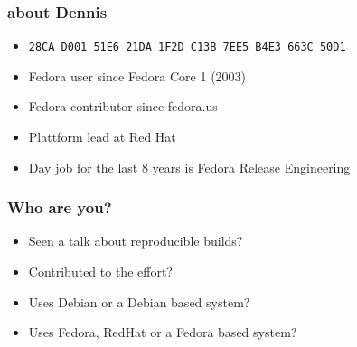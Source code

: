 \documentclass[14pt]{beamer}
\newif\ifplacelogo
\begin{document}
\begin{frame}
 \frametitle{about Dennis}

 \begin{itemize}
  \item \small{\texttt{28CA D001 51E6 21DA 1F2D  C13B 7EE5 B4E3 663C 50D1}}
  \item Fedora user since Fedora Core 1 (2003)
  \item Fedora contributor since fedora.us
  \item Plattform lead at Red Hat
  \item Day job for the last 8 years is Fedora Release Engineering
  \end{itemize}
\end{frame}



\begin{frame}
 \frametitle{Who are you?}
 \begin{itemize}
  \item<2-5> Seen a talk about reproducible builds?
  \item<3-5> Contributed to the effort?
  \item<4-5> Uses Debian or a Debian based system?
  \item<5> Uses Fedora, RedHat or a Fedora based system?
 \end{itemize}
\end{frame}

\placelogotrue
\end{document}
